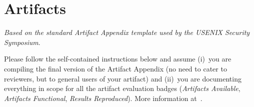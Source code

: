 \section*{Artifacts}\label{s:artifact-appendix}

\emph{Based on the standard Artifact Appendix template used by the USENIX Security
Symposium}.

Please follow the self-contained instructions below and assume
(i)~you are compiling the final version of the Artifact Appendix (no need to
cater to reviewers, but to general users of your artifact) and (ii)~you are
documenting everything in scope for all the artifact evaluation badges
(\emph{Artifacts Available}, \emph{Artifacts Functional}, \emph{Results
Reproduced}). More information at~\cite{secartifacts}.



